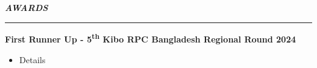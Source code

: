 {\noindent\fontsize{13pt}{16pt}\bfseries\itshape AWARDS\par}
\vspace{0.5em}
\hrule
\vspace{0.7em}

\noindent
{\fontsize{12pt}{15pt}\bfseries First Runner Up - 5\textsuperscript{th} Kibo RPC Bangladesh Regional Round 2024}\\
\begin{itemize}
    \item Details
\end{itemize}